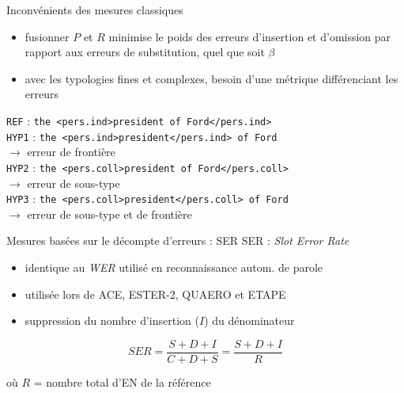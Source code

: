 \documentclass[xetex,xcolor={table,usenames,dvipsnames}]{beamer}
\begin{document}
\begin{frame}{Inconvénients des mesures classiques}
	\begin{itemize}
		\item fusionner $P$ et $R$ minimise le poids des erreurs d'insertion et d'omission par rapport aux erreurs de substitution, quel que soit $\beta$
		\item avec les typologies fines et complexes, besoin d'une métrique différenciant les erreurs
	\end{itemize}
	
			\textcolor{deepred}{\texttt{REF}} : \texttt{the <pers.ind>president of Ford</pers.ind>}\\\medskip
	\textcolor{deepblue}{\texttt{HYP1}} :  \texttt{the <pers.ind>president</pers.ind> of Ford} \\$\rightarrow$ erreur de frontière\\\medskip
	\textcolor{deepblue}{\texttt{HYP2}} :  \texttt{the <pers.coll>president of Ford</pers.coll>} \\$\rightarrow$ erreur de sous-type\\\medskip
		\textcolor{deepblue}{\texttt{HYP3}} :  \texttt{the <pers.coll>president</pers.coll> of Ford} \\$\rightarrow$ erreur de sous-type et de frontière
\end{frame}

\begin{frame}{Mesures basées sur le décompte d'erreurs : \textsc{SER}}
	\textsc{SER} : \textit{Slot Error Rate} \citep{makhoul1999performance}
	\begin{itemize}
		\item identique au \textit{WER} utilisé en reconnaissance autom. de parole
		\item utilisée lors de \textsc{ACE}, \textsc{ESTER-2}, \textsc{QUAERO} et \textsc{ETAPE}
		\item suppression du nombre d'insertion ($I$) du dénominateur
	\end{itemize}
	
	\begin{equation*}
		SER = \dfrac{S + D + I}{C + D + S} = \dfrac{S + D + I}{R}
	\end{equation*}
	
	où $R$ = nombre total d'\textsc{EN} de la référence
\end{frame}
\end{document}
